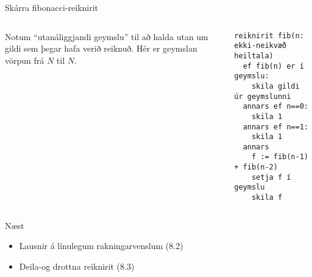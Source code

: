 \documentclass{beamer}
\begin{document}
\begin{frame}[fragile]{Skárra fibonacci-reiknirit}
\begin{columns}
Notum ``utanáliggjandi geymslu'' til að halda utan um gildi sem þegar hafa verið reiknuð. Hér er geymslan vörpun frá $N$ til $N$.
\begin{verbatim}
reiknirit fib(n: ekki-neikvæð heiltala)
  ef fib(n) er í geymslu:
    skila gildi úr geymslunni
  annars ef n==0:
    skila 1
  annars ef n==1:
    skila 1
  annars
    f := fib(n-1) + fib(n-2)
    setja f í geymslu
    skila f
\end{verbatim}
\end{columns}
\end{frame}

\begin{frame}{Næst}
\begin{itemize}
 \item Lausnir á línulegum rakningarvenslum (8.2)
 \item Deila-og drottna reiknirit (8.3)
\end{itemize}

\end{frame}
\end{document}
